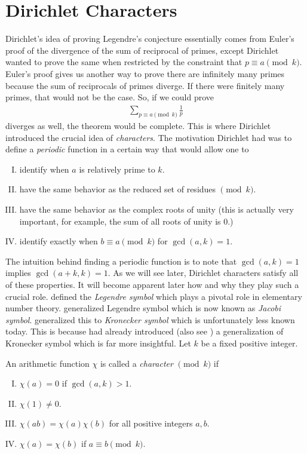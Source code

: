 \documentclass[elemannt.tex]{subfile}
\begin{document}
	\section{Dirichlet Characters}
	Dirichlet's idea of proving Legendre's conjecture essentially comes from Euler's proof of the divergence of the sum of reciprocal of primes, except Dirichlet wanted to prove the same when restricted by the constraint that $p\equiv a\pmod{k}$. Euler's proof gives us another way to prove there are infinitely many primes because the sum of reciprocals of primes diverge. If there were finitely many primes, that would not be the case. So, if we could prove
		\begin{align*}
			\sum_{p\equiv a\pmod{k}}\frac{1}{p}
		\end{align*}
	diverges as well, the theorem would be complete. This is where Dirichlet introduced the crucial idea of \textit{characters}. The motivation Dirichlet had was to define a \textit{periodic} function in a certain way that would allow one to
		\begin{enumerate}[(I)]
			\item identify when $a$ is relatively prime to $k$.
			\item have the same behavior as the reduced set of residues $\pmod{k}$.
			\item have the same behavior as the complex roots of unity (this is actually very important, for example, the sum of all roots of unity is $0$.)
			\item identify exactly when $b\equiv a\pmod{k}$ for $\gcd(a,k)=1$.
		\end{enumerate}
	The intuition behind finding a periodic function is to note that $\gcd(a,k)=1$ implies $\gcd(a+k,k)=1$. As we will see later, Dirichlet characters satisfy all of these properties. It will become apparent later how and why they play such a crucial role. \textcite[pp. 186]{legendre_1798} defined the \textit{Legendre symbol} which plays a pivotal role in elementary number theory. \textcite{jacobi_1846} generalized Legendre symbol which is now known as \textit{Jacobi symbol}. \textcite[pp. 770]{kronecker_1885} generalized this to \textit{Kronecker symbol} which is unfortunately less known today. This is because \textcite{dirichlet_1837} had already introduced (also see \textcite{dirichlet_1897_21}) a generalization of Kronecker symbol which is far more insightful. Let $k$ be a fixed positive integer.
		\begin{definition}
			An arithmetic function $\chi$ is called a \textit{character} $\pmod{k}$ if
				\begin{enumerate}[(I)]
					\item $\chi(a)=0$ if $\gcd(a,k)>1$.
					\item $\chi(1)\neq0$.
					\item $\chi(ab)=\chi(a)\chi(b)$ for all positive integers $a,b$.
					\item $\chi(a)=\chi(b)$ if $a\equiv b\pmod{k}$.
				\end{enumerate}
		\end{definition}
\end{document}
